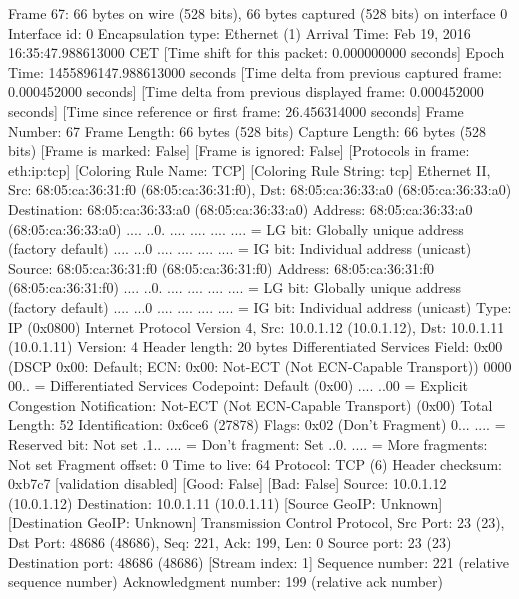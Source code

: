 Frame 67: 66 bytes on wire (528 bits), 66 bytes captured (528 bits) on interface 0
    Interface id: 0
    Encapsulation type: Ethernet (1)
    Arrival Time: Feb 19, 2016 16:35:47.988613000 CET
    [Time shift for this packet: 0.000000000 seconds]
    Epoch Time: 1455896147.988613000 seconds
    [Time delta from previous captured frame: 0.000452000 seconds]
    [Time delta from previous displayed frame: 0.000452000 seconds]
    [Time since reference or first frame: 26.456314000 seconds]
    Frame Number: 67
    Frame Length: 66 bytes (528 bits)
    Capture Length: 66 bytes (528 bits)
    [Frame is marked: False]
    [Frame is ignored: False]
    [Protocols in frame: eth:ip:tcp]
    [Coloring Rule Name: TCP]
    [Coloring Rule String: tcp]
Ethernet II, Src: 68:05:ca:36:31:f0 (68:05:ca:36:31:f0), Dst: 68:05:ca:36:33:a0 (68:05:ca:36:33:a0)
    Destination: 68:05:ca:36:33:a0 (68:05:ca:36:33:a0)
        Address: 68:05:ca:36:33:a0 (68:05:ca:36:33:a0)
        .... ..0. .... .... .... .... = LG bit: Globally unique address (factory default)
        .... ...0 .... .... .... .... = IG bit: Individual address (unicast)
    Source: 68:05:ca:36:31:f0 (68:05:ca:36:31:f0)
        Address: 68:05:ca:36:31:f0 (68:05:ca:36:31:f0)
        .... ..0. .... .... .... .... = LG bit: Globally unique address (factory default)
        .... ...0 .... .... .... .... = IG bit: Individual address (unicast)
    Type: IP (0x0800)
Internet Protocol Version 4, Src: 10.0.1.12 (10.0.1.12), Dst: 10.0.1.11 (10.0.1.11)
    Version: 4
    Header length: 20 bytes
    Differentiated Services Field: 0x00 (DSCP 0x00: Default; ECN: 0x00: Not-ECT (Not ECN-Capable Transport))
        0000 00.. = Differentiated Services Codepoint: Default (0x00)
        .... ..00 = Explicit Congestion Notification: Not-ECT (Not ECN-Capable Transport) (0x00)
    Total Length: 52
    Identification: 0x6ce6 (27878)
    Flags: 0x02 (Don't Fragment)
        0... .... = Reserved bit: Not set
        .1.. .... = Don't fragment: Set
        ..0. .... = More fragments: Not set
    Fragment offset: 0
    Time to live: 64
    Protocol: TCP (6)
    Header checksum: 0xb7c7 [validation disabled]
        [Good: False]
        [Bad: False]
    Source: 10.0.1.12 (10.0.1.12)
    Destination: 10.0.1.11 (10.0.1.11)
    [Source GeoIP: Unknown]
    [Destination GeoIP: Unknown]
Transmission Control Protocol, Src Port: 23 (23), Dst Port: 48686 (48686), Seq: 221, Ack: 199, Len: 0
    Source port: 23 (23)
    Destination port: 48686 (48686)
    [Stream index: 1]
    Sequence number: 221    (relative sequence number)
    Acknowledgment number: 199    (relative ack number)

